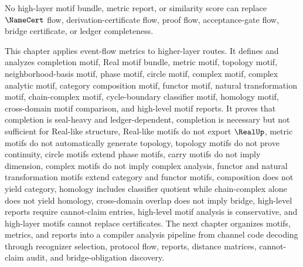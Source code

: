 \begin{corollary}
\label{cor:higher-case-motifs-cannot-replace-certificates}
No high-layer motif bundle, metric report, or similarity score can replace $\NameCert$ flow, derivation-certificate flow, proof flow, acceptance-gate flow, bridge certificate, or ledger completeness.
\end{corollary}

\begin{remark}[Outlook]
\label{rem:higher-case-outlook}
This chapter applies event-flow metrics to higher-layer routes. It defines and analyzes completion motif, Real motif bundle, metric motif, topology motif, neighborhood-basis motif, phase motif, circle motif, complex motif, complex analytic motif, category composition motif, functor motif, natural transformation motif, chain-complex motif, cycle-boundary classifier motif, homology motif, cross-domain motif comparison, and high-level motif reports. It proves that completion is seal-heavy and ledger-dependent, completion is necessary but not sufficient for Real-like structure, Real-like motifs do not export $\RealUp$, metric motifs do not automatically generate topology, topology motifs do not prove continuity, circle motifs extend phase motifs, carry motifs do not imply dimension, complex motifs do not imply complex analysis, functor and natural transformation motifs extend category and functor motifs, composition does not yield category, homology includes classifier quotient while chain-complex alone does not yield homology, cross-domain overlap does not imply bridge, high-level reports require cannot-claim entries, high-level motif analysis is conservative, and high-layer motifs cannot replace certificates. The next chapter organizes motifs, metrics, and reports into a compiler analysis pipeline from channel code decoding through recognizer selection, protocol flow, reports, distance matrices, cannot-claim audit, and bridge-obligation discovery.
\end{remark}
